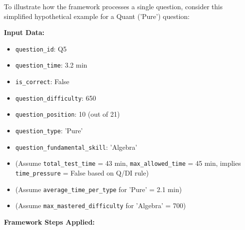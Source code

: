 \documentclass{article}
\begin{document}
To illustrate how the framework processes a single question, consider this simplified hypothetical example for a Quant ('Pure') question:

\textbf{Input Data:}
\begin{itemize}
    \item \texttt{question\_id}: Q5
    \item \texttt{question\_time}: 3.2 min
    \item \texttt{is\_correct}: False
    \item \texttt{question\_difficulty}: 650
    \item \texttt{question\_position}: 10 (out of 21)
    \item \texttt{question\_type}: 'Pure'
    \item \texttt{question\_fundamental\_skill}: 'Algebra'
    \item (Assume \texttt{total\_test\_time} = 43 min, \texttt{max\_allowed\_time} = 45 min, implies \texttt{time\_pressure} = False based on Q/DI rule)
    \item (Assume \texttt{average\_time\_per\_type} for 'Pure' = 2.1 min)
    \item (Assume \texttt{max\_mastered\_difficulty} for 'Algebra' = 700)
\end{itemize}
\newpage
\textbf{Framework Steps Applied:}
\end{document}
